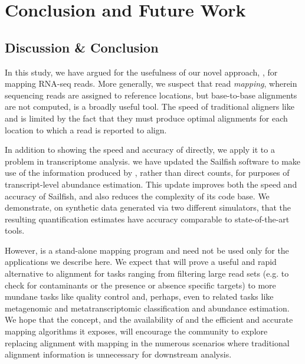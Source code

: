 
\chapter{Conclusion and Future Work} %

\label{conclusion} %



\section{Discussion \& Conclusion}

In this study, we have argued for the usefulness of our novel approach, \qm, for mapping RNA-seq reads.  More generally, we suspect that read \textit{mapping}, wherein sequencing reads are assigned to reference locations, but base-to-base alignments are not computed, is a broadly useful tool.  The speed of traditional aligners like \bt and \STAR is limited by the fact that they must produce optimal alignments for each location to which a read is reported to align.

In addition to showing the speed and accuracy of \qm directly, we apply it to a problem in transcriptome analysis. we have updated the Sailfish software to make use of the \qm information produced by \rapmap, rather than direct \kmer counts, for purposes of transcript-level abundance estimation.  This update improves both the speed and accuracy of Sailfish, and also reduces the complexity of its code base. We demonstrate, on synthetic data generated via two different simulators, that the resulting quantification estimates have accuracy comparable to state-of-the-art tools. 

However, \rapmap is a stand-alone mapping program and need not be used only for the applications we describe here.  We expect that \qm will prove a useful and rapid alternative to alignment for tasks ranging from filtering large read sets (e.g. to check for contaminants or the presence or absence specific targets) to more mundane tasks like quality control and, perhaps, even to related tasks like metagenomic and metatranscriptomic classification and abundance estimation. We hope that the \qm concept, and the availability of \rapmap and the efficient and accurate mapping algorithms it exposes, will encourage the community to explore replacing alignment with mapping in the numerous scenarios where traditional alignment information is unnecessary for downstream analysis.

